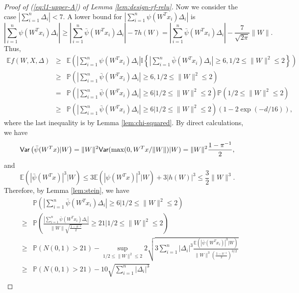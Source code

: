 \begin{proof}[Proof of (\ref{eq:l1-upper-A}) of Lemma \ref{lem:design-rf-relu}]
Now we consider the case $\left|\sum_{i=1}^n\Delta_i\right|< 7$. A lower bound for $\left|\sum_{i=1}^n\psi(W^Tx_i)\Delta_i\right|$ is
\begin{equation}
\left|\sum_{i=1}^n\psi(W^Tx_i)\Delta_i\right| \geq \left|\sum_{i=1}^n\bar{\psi}(W^Tx_i)\Delta_i\right| - 7h(W) = \left|\sum_{i=1}^n\bar{\psi}(W^Tx_i)\Delta_i\right| - \frac{7}{\sqrt{2\pi}}\|W\|. \label{eq:seven}
\end{equation}
Thus,
\begin{eqnarray}
\nonumber \mathbb{E}f(W,X,\Delta) &\geq& \mathbb{E}\left(\left|\sum_{i=1}^n\psi(W^Tx_i)\Delta_i\right|\mathbb{I}\left\{\left|\sum_{i=1}^n\bar{\psi}(W^Tx_i)\Delta_i\right|\geq 6, 1/2\leq \|W\|^2\leq 2\right\}\right) \\
\nonumber &\geq& \mathbb{P}\left(\left|\sum_{i=1}^n\bar{\psi}(W^Tx_i)\Delta_i\right|\geq 6, 1/2\leq \|W\|^2\leq 2\right) \\
\nonumber &=& \mathbb{P}\left(\left|\sum_{i=1}^n\bar{\psi}(W^Tx_i)\Delta_i\right|\geq 6\Big|1/2\leq \|W\|^2\leq 2\right)\mathbb{P}\left(1/2\leq \|W\|^2\leq 2\right) \\
\nonumber &\geq& \mathbb{P}\left(\left|\sum_{i=1}^n\bar{\psi}(W^Tx_i)\Delta_i\right|\geq 6\Big|1/2\leq \|W\|^2\leq 2\right)\left(1-2\exp(-d/16)\right),
\end{eqnarray}
where the last inequality is by Lemma \ref{lem:chi-squared}. By direct calculations, we have
\begin{equation}
\Var\left(\bar{\psi}(W^Tx)|W\right)=\|W\|^2\Var(\max(0,W^Tx/\|W\|)|W)=\|W\|^2\frac{1-\pi^{-1}}{2}, \label{eq:cond-var-X-W}
\end{equation}
and
$$\mathbb{E}\left(|\bar{\psi}(W^Tx)|^3|W\right) \leq 3\mathbb{E}\left(|\psi(W^Tx)|^3|W\right)+3|h(W)|^3 \leq \frac{3}{2}\|W\|^3.$$
Therefore, by Lemma \ref{lem:stein}, we have
\begin{eqnarray}
\nonumber && \mathbb{P}\left(\left|\sum_{i=1}^n\bar{\psi}(W^Tx_i)\Delta_i\right|\geq 6\Big|1/2\leq \|W\|^2\leq 2\right) \\
\nonumber &\geq& \mathbb{P}\left(\frac{\left|\sum_{i=1}^n\bar{\psi}(W^Tx_i)\Delta_i\right|}{\|W\|\sqrt{\frac{1-\pi^{-1}}{2}}}\geq 21\Bigg|1/2\leq \|W\|^2\leq 2\right) \\
\nonumber &\geq& \mathbb{P}\left(N(0,1)>21\right) - \sup_{1/2\leq \|W\|^2\leq 2} 2\sqrt{3\sum_{i=1}^n|\Delta_i|^3\frac{\mathbb{E}\left(|\bar{\psi}(W^Tx_i)|^3|W\right)}{\|W\|^3\left(\frac{1-\pi^{-1}}{2}\right)^{3/2}}} \\
\nonumber &\geq& \mathbb{P}\left(N(0,1)>21\right) - 10\sqrt{\sum_{i=1}^n|\Delta_i|^3} \\

\end{eqnarray}
\end{proof}
